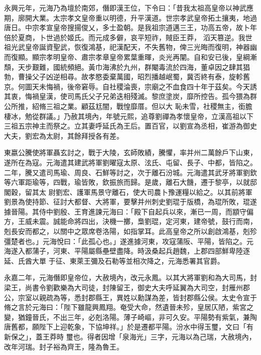 \begin{pinyinscope}
 永興元年，元海乃為壇於南郊，僭即漢王位，下令曰：「昔我太祖高皇帝以神武應期，廓開大業。太宗孝文皇帝重以明德，升平漢道。世宗孝武皇帝拓土攘夷，地過唐日。中宗孝宣皇帝搜揚俊乂，多士盈朝。是我祖宗道邁三王，功高五帝，故卜年倍於夏商，卜世過於姬氏。而元成多僻，哀平短祚，賊臣王莽，
 滔天篡逆。我世祖光武皇帝誕資聖武，恢復鴻基，祀漢配天，不失舊物，俾三光晦而復明，神器幽而復顯。顯宗孝明皇帝、肅宗孝章皇帝累葉重暉，炎光再闡。自和安已後，皇綱漸頹，天步艱難，國統頻絕。黃巾海沸於九州，群閹毒流於四海，董卓因之肆其猖勃，曹操父子凶逆相尋。故孝愍委棄萬國，昭烈播越岷蜀，冀否終有泰，旋軫舊京。何圖天未悔禍，後帝窘辱。自社稷淪喪，宗廟之不血食四十年于茲矣。今天誘其衷，悔禍皇漢，使司馬氏父子兄弟迭相殘滅。黎庶塗炭，靡所控告。孤今猥為群公所推，紹脩三祖之業。顧茲尪闇，戰惶靡厝。但以大
 恥未雪，社稷無主，銜膽棲冰，勉從群議。」乃赦其境內，年號元熙，追尊劉禪為孝懷皇帝，立漢高祖以下三祖五宗神主而祭之。立其妻呼延氏為王后。置百官，以劉宣為丞相，崔游為御史大夫，劉宏為太尉，其餘拜授各有差。



 東嬴公騰使將軍聶玄討之，戰于大陵，玄師敗績，騰懼，率并州二萬餘戶下山東，遂所在為寇。元海遣其建武將軍劉曜寇太原、泫氏、屯留、長子、中都，皆陷之。二年，騰又遣司馬瑜、周良、石鮮等討之，次于離石汾城。元海遣其武牙將軍劉欽等六軍距瑜等，四戰，瑜皆敗，欽振旅而歸。是歲，離石大饑，遷于黎亭，以就邸閣穀，留其太
 尉劉宏、護軍馬景守離石，使大司農卜豫運糧以給之。以其前將軍劉景為使持節、征討大都督、大將軍，要擊并州刺史劉琨于版橋，為琨所敗，琨遂據晉陽。其侍中劉殷、王育進諫元海曰：「殿下自起兵以來，漸已一周，而顓守偏方，王威未震。誠能命將四出，決機一擲，梟劉琨，定河東，建帝號，鼓行而南，剋長安而都之，以關中之眾席卷洛陽，如指掌耳。此高皇帝之所以創啟鴻基，剋殄彊楚者也。」元海悅曰：「此孤心也。」遂進據河東，攻寇蒲阪、平陽，皆陷之。元海遂入都蒲子，河東、平陽屬縣壘壁盡降。時汲桑起兵趙魏，上郡四部鮮卑陸逐延、氏酋大單
 于征、東萊王彌及石勒等並相次降之，元海悉署其官爵。



 永嘉二年，元海僭即皇帝位，大赦境內，改元永鳳。以其大將軍劉和為大司馬，封梁王，尚書令劉歡樂為大司徒，封陳留王，御史大夫呼延翼為大司空，封雁州郡公，宗室以親疏為等，悉封郡縣王，異姓以勳謀為差，皆封郡縣公侯。太史令宣于脩之言於元海曰：「陛下雖龍興鳳翔。奄受大命，然遺晉未殄，皇居仄陋，紫宮之變，猶鐘晉氏，不出三年，必剋洛陽。薄子崎嶇，非可久安。平陽勢有紫氣，兼陶唐舊都，願陛下上迎乾象，下協坤祥。」於是遷都平陽。汾水中得玉璽，文曰「有新保之」，蓋王莽時
 璽也。得者因增「泉海光」三字，元海以為己瑞，大赦境內，改年河瑞。封子裕為齊王，隆為魯王。




\end{pinyinscope}
